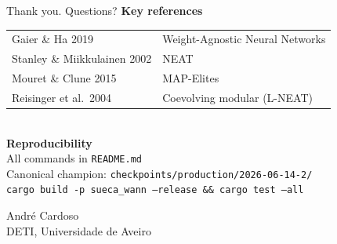 \documentclass[10pt]{beamer}
\begin{document}
\begin{frame}{Thank you. Questions?}
  \centering
  \vspace{8pt}
  \textbf{Key references}\\[4pt]
  \begin{tabular}{@{}ll@{}}
    \toprule
    Gaier \& Ha 2019 & Weight-Agnostic Neural Networks\\
    Stanley \& Miikkulainen 2002 & NEAT\\
    Mouret \& Clune 2015 & MAP-Elites\\
    Reisinger et al.\ 2004 & Coevolving modular (L-NEAT)\\
    \bottomrule
  \end{tabular}\\
  \vspace{4pt}
  \textbf{Reproducibility}\\[4pt]
  \scriptsize
  All commands in \texttt{README.md}\\
  Canonical champion: \texttt{checkpoints/production/2026-06-14-2/}\\
  \texttt{cargo build -p sueca\_wann --release \&\& cargo test --all}
  \vspace{6pt}
  \begin{center}
    \normalsize André Cardoso\\
    \small DETI, Universidade de Aveiro
  \end{center}
\end{frame}
\end{document}
